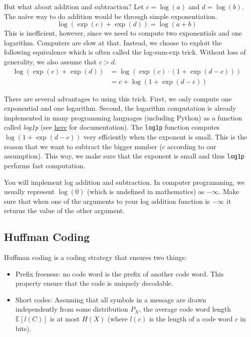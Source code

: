 \documentclass[11pt, leqno, a4paper]{article}
\begin{document}
But what about addition and subtraction? Let $ c = \log(a) $ and $ d = \log(b) $. The na\"ive way to do addition would be through simple exponentiation.
\begin{equation*}
\log(\exp(c) + \exp(d)) = \log(a + b)
\end{equation*}
This is inefficient, however, since we need to compute two exponentials and one logarithm. Computers are slow at that. Instead, we choose to exploit the
following equivalence which is often called the log-sum-exp trick. Without loss of generality, we also assume that $ c > d $.
\begin{align*}
\log(\exp(c) + \exp(d)) &= \log(\exp(c) \cdot (1 + \exp(d-c)))  \\
&= c + \log(1 + \exp(d-c)) 
\end{align*}

There are several advantages to using this trick. First, we only compute one exponential and one logarithm. Second, the logarithm computation is already 
implemented in many programming languages (including Python) as a function called \textit{log1p} (see \href{https://docs.python.org/3/library/math.html}{here} for documentation). The \texttt{log1p} function computes $ \log(1 + \exp(d-c)) $ very efficiently when the exponent is small. This is the reason that we want to subtract
the bigger number ($ c $ according to our assumption). This way, we make sure that the exponent is small and thus \texttt{log1p} performs fast computation.

You will implement log addition and subtraction. In computer programming, we usually represent $ \log(0) $ (which is undefined in mathematics) as 
$ -\infty $. Make sure that when one of the arguments to your log addition function is $ -\infty $ it returns the value of the other argument.

\subsection{Huffman Coding}

Huffman coding is a coding strategy that ensures two things:
\begin{itemize}
\item Prefix freeness: no code word is the prefix of another code word. This property ensure that the code is uniquely decodable.
\item Short codes: Assuming that all symbols in a message are drawn independently from some distribution $ P_{X} $, the average code word
length $ \mathbb{E}\left[l(C)\right] $ is at most $ H(X) $ (where $ l(c) $ is the length of a code word $ c $ in bits).
\end{itemize}
\end{document}
